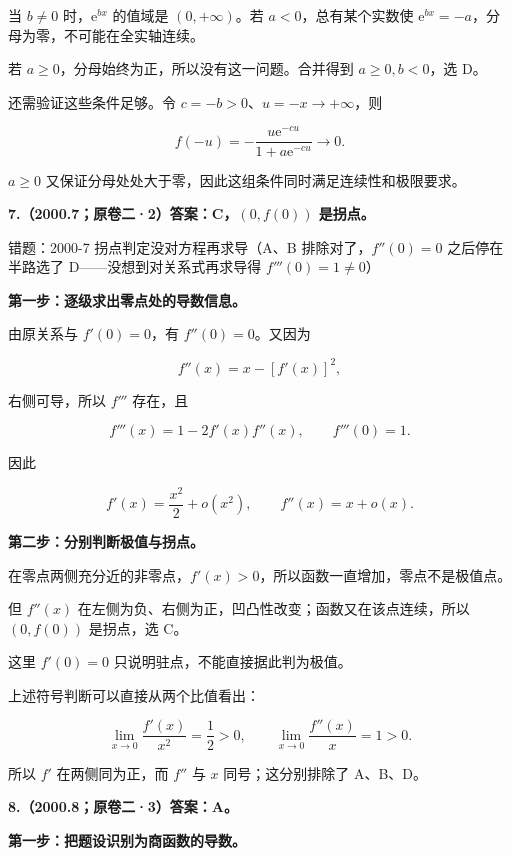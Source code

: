 \documentclass[UTF8,11pt,fontset=windows]{ctexart}
\begin{document}
当 $b\ne0$ 时，$\mathrm e^{bx}$ 的值域是 $(0,+\infty)$。若 $a<0$，总有某个实数使 $\mathrm e^{bx}=-a$，分母为零，不可能在全实轴连续。

若 $a\ge0$，分母始终为正，所以没有这一问题。合并得到 $a\ge0,b<0$，选 D。

还需验证这些条件足够。令 $c=-b>0$、$u=-x\to+\infty$，则

$$
f(-u)=-\frac{u\mathrm e^{-cu}}{1+a\mathrm e^{-cu}}\longrightarrow0.
$$

$a\ge0$ 又保证分母处处大于零，因此这组条件同时满足连续性和极限要求。

\clearpage

\textbf{7.（2000.7；原卷二·2）答案：C，$(0,f(0))$ 是拐点。}

\begingroup\color{gray}错题：2000-7 拐点判定没对方程再求导（A、B 排除对了，$f''(0)=0$ 之后停在半路选了 D——没想到对关系式再求导得 $f'''(0)=1\ne0$）\par\endgroup

\textbf{第一步：逐级求出零点处的导数信息。}

由原关系与 $f'(0)=0$，有 $f''(0)=0$。又因为

$$
f''(x)=x-[f'(x)]^2,
$$

右侧可导，所以 $f'''$ 存在，且

$$
f'''(x)=1-2f'(x)f''(x),\qquad f'''(0)=1.
$$

因此

$$
f'(x)=\frac{x^2}{2}+o(x^2),
\qquad f''(x)=x+o(x).
$$

\textbf{第二步：分别判断极值与拐点。}

在零点两侧充分近的非零点，$f'(x)>0$，所以函数一直增加，零点不是极值点。

但 $f''(x)$ 在左侧为负、右侧为正，凹凸性改变；函数又在该点连续，所以 $(0,f(0))$ 是拐点，选 C。

这里 $f'(0)=0$ 只说明驻点，不能直接据此判为极值。

上述符号判断可以直接从两个比值看出：

$$
\lim_{x\to0}\frac{f'(x)}{x^2}=\frac12>0,
\qquad \lim_{x\to0}\frac{f''(x)}x=1>0.
$$

所以 $f'$ 在两侧同为正，而 $f''$ 与 $x$ 同号；这分别排除了 A、B、D。

\clearpage

\textbf{8.（2000.8；原卷二·3）答案：A。}

\textbf{第一步：把题设识别为商函数的导数。}
\end{document}
